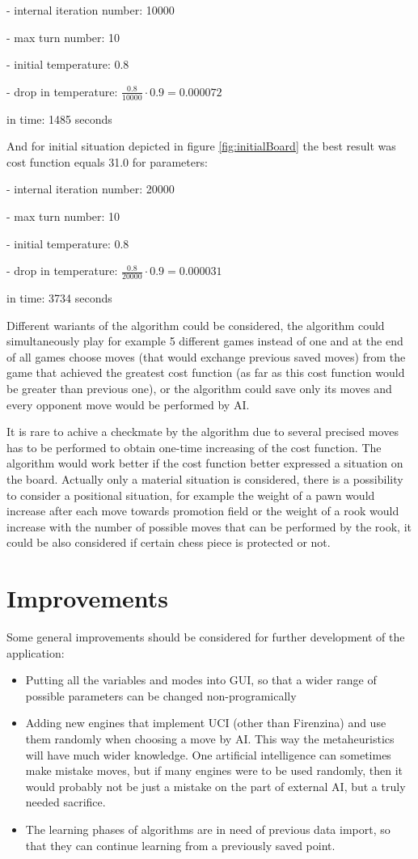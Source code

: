 \documentclass[pdftex]{article}
\begin{document}
- internal iteration number: 10000

- max turn number: 10

- initial temperature: 0.8

- drop in temperature: $\frac{0.8}{10000} \cdot 0.9 = 0.000072$

in time: 1485 seconds

And for initial situation depicted in figure \ref{fig:initialBoard} the best result was cost function equals 31.0 for parameters:

- internal iteration number: 20000

- max turn number: 10

- initial temperature: 0.8

- drop in temperature: $\frac{0.8}{20000} \cdot 0.9 = 0.000031$

in time: 3734 seconds

Different wariants of the algorithm could be considered, the algorithm could simultaneously play for example 5 different games instead of one and at the end of all games choose moves (that would exchange previous saved moves) from the game that achieved the greatest cost function (as far as this cost function would be greater than previous one), or the algorithm could save only its moves and every opponent move would be performed by AI.

It is rare to achive a checkmate by the algorithm due to several precised moves has to be performed to obtain one-time increasing of the cost function. The algorithm would work better if the cost function better expressed a situation on the board. Actually only a material situation is considered, there is a possibility to consider a positional situation, for example the weight of a pawn would increase after each move towards promotion field or the weight of a rook would increase with the number of possible moves that can be performed by the rook, it could be also considered if certain chess piece is protected or not.

\section{Improvements}
\label{sec:improvements}

Some general improvements should be considered for further development of the application:
\begin{itemize}
 	\item Putting all the variables and modes into GUI, so that a wider range of possible parameters can be changed non-programically 
 	\item Adding new engines that implement UCI (other than Firenzina) and use them randomly when choosing a move by AI. This way the metaheuristics will have much wider knowledge. One artificial intelligence can sometimes make mistake moves, but if many engines were to be used randomly, then it would probably not be just a mistake on the part of external AI, but a truly needed sacrifice.
 	\item The learning phases of algorithms are in need of previous data import, so that they can continue learning from a previously saved point.
\end{itemize}
\end{document}
